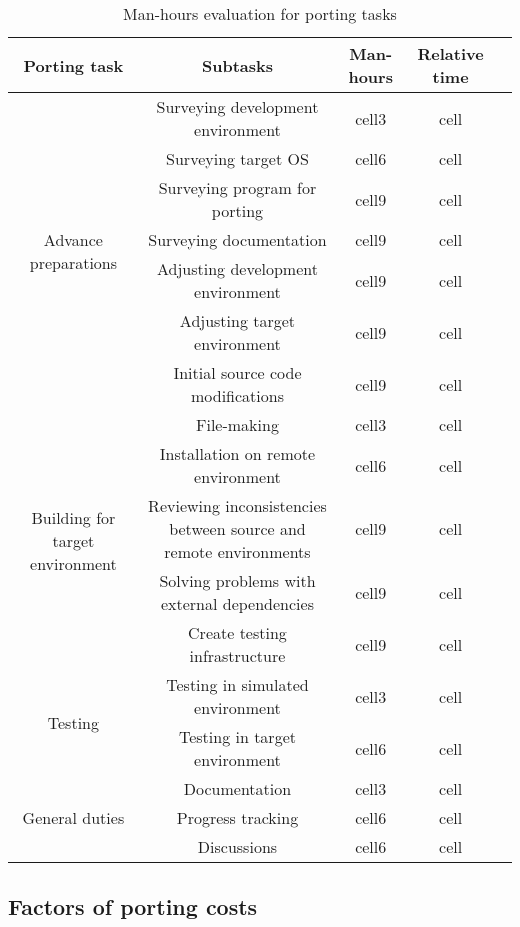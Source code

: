 \begin{table*}
\centering
\begin{tabular}{ |c|c|c|c|c| }
\hline
Porting task & Subtasks & Man-hours & Relative time \\
\hline
\multirow{7}{5em}{Advance preparations} & Surveying development environment & cell3  & cell\\
& Surveying target OS & cell6 & cell \\
& Surveying program for porting & cell9 & cell \\
& Surveying documentation & cell9 & cell \\
& Adjusting development environment & cell9 & cell \\
& Adjusting target environment & cell9 & cell \\
& Initial source code modifications & cell9 & cell \\
\hline
\multirow{5}{5em}{Building for target environment} & File-making & cell3  & cell\\
& Installation on remote environment & cell6 & cell \\
& Reviewing inconsistencies between source and remote environments & cell9 & cell \\
& Solving problems with external dependencies & cell9 & cell \\
& Create testing infrastructure & cell9 & cell \\
\hline
\multirow{2}{5em}{Testing} & Testing in simulated environment & cell3  & cell\\
& Testing in target environment & cell6 & cell \\
\hline
\multirow{3}{5em}{General duties} & Documentation & cell3  & cell\\
& Progress tracking & cell6 & cell \\
& Discussions & cell6 & cell \\
\hline
\end{tabular}
\caption{Man-hours evaluation for porting tasks}
\end{table*}


\subsection{Factors of porting costs}

